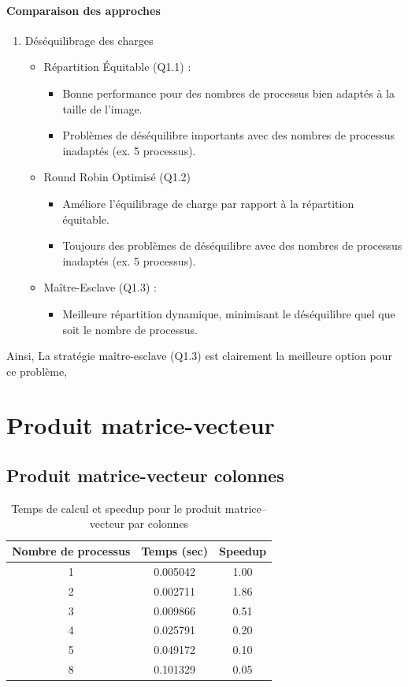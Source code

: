 \documentclass[a4paper,13pt]{book}
\begin{document}
  \paragraph{Comparaison des approches}
  \begin{enumerate}
    \item Déséquilibrage des charges 
    \begin{itemize}
      \item Répartition Équitable (Q1.1) :
      \begin{itemize}
        \item Bonne performance pour des nombres de processus bien adaptés à la taille de l'image.
        \item Problèmes de déséquilibre importants avec des nombres de processus inadaptés (ex. 5 processus).  
      \end{itemize}
      \item Round Robin Optimisé (Q1.2) 
      \begin{itemize}
        \item Améliore l'équilibrage de charge par rapport à la répartition équitable.
        \item Toujours des problèmes de déséquilibre avec des nombres de processus inadaptés (ex. 5 processus).
      \end{itemize}
      \item Maître-Esclave (Q1.3) :
      \begin{itemize}
        \item Meilleure répartition dynamique, minimisant le déséquilibre quel que soit le nombre de processus.
      \end{itemize} 
    \end{itemize}
  \end{enumerate}
Ainsi, La stratégie maître-esclave (Q1.3) est clairement la meilleure option pour ce problème,
\section{Produit matrice-vecteur}
\subsection{Produit matrice-vecteur colonnes}

\begin{table}[ht]
  \centering
  \caption{Temps de calcul et speedup pour le produit matrice--vecteur par colonnes}
  \begin{tabular}{@{}ccc@{}}
    \toprule
    Nombre de processus & Temps (sec) & Speedup \\ \midrule
    1 & 0.005042 & 1.00 \\
    2 & 0.002711 & 1.86 \\
    3 & 0.009866 & 0.51 \\
    4 & 0.025791 & 0.20 \\
    5 & 0.049172 & 0.10 \\
    8 & 0.101329 & 0.05 \\ \bottomrule
  \end{tabular}
  \label{tab:col}
\end{table}
\end{document}
